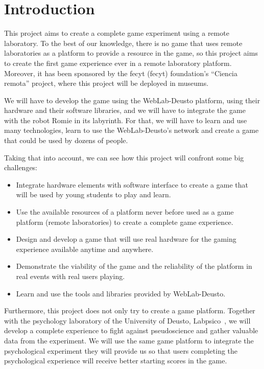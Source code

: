 \chapter{Introduction}

This project aims to create a complete game experiment using a remote laboratory. To the best of our
knowledge, there is no game that uses remote laboratories as a platform to provide a resource in the
game, so this project aims to create the first game experience ever in a remote laboratory platform.
Moreover, it has been sponsored by the \acrshort{fecyt} (\acrlong{fecyt}) foundation's ``Ciencia
remota'' project, where this project will be deployed in museums.

We will have to develop the game using the WebLab-Deusto platform, using their hardware and their
software libraries, and we will have to integrate the game with the robot Romie in its labyrinth.
For that, we will have to learn and use many technologies, learn to use the WebLab-Deusto's network
and create a game that could be used by dozens of people.

Taking that into account, we can see how this project will confront some big challenges:

\begin{itemize}

\item Integrate hardware elements with software interface to create a game that will be used by
young students to play and learn.

\item Use the available resources of a platform never before used as a game platform (remote
laboratories) to create a complete game experience.

\item Design and develop a game that will use real hardware for the gaming experience available
anytime and anywhere.

\item Demonstrate the viability of the game and the reliability of the platform in real events with
real users playing.

\item Learn and use the tools and libraries provided by WebLab-Deusto.

\end{itemize}

Furthermore, this project does not only try to create a game platform. Together with the psychology
laboratory of the University of Deusto, Labpsico~\cite{labpsico_web}, we will develop a complete
experience to fight against pseudoscience and gather valuable data from the experiment. We will use
the same game platform to integrate the psychological experiment they will provide us so that users
completing the psychological experience will receive better starting scores in the game.

